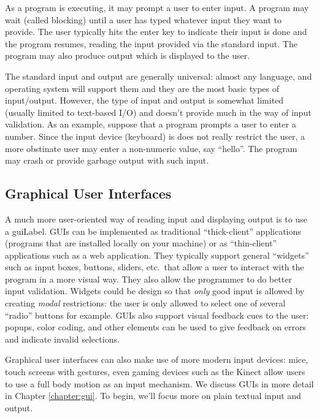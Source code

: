 As a program is executing, it may prompt a user to enter input.  A program
may wait (called blocking) until a user has typed whatever input they want to provide.
The user typically hits the enter key to indicate their input is done and the 
program resumes, reading the input provided via the standard input.  The
program may also produce output which is displayed to the user.

The standard input and output are generally universal: almost any language, 
and operating system will support them and they are the most basic types
of input/output.  However, the type of input and output is somewhat limited (usually limited
to text-based I/O) and doesn't provide much in the way of input \gls{validation}.
As an example, suppose that a program prompts a user to enter a number.  
Since the input device (keyboard) is does not really restrict the user, a more
obstinate user may enter a non-numeric value, say ``hello''.  The program
may crash or provide garbage output with such input.  

\subsection{Graphical User Interfaces}

A much more user-oriented way of reading input and displaying output is to use
a \gls{guiLabel}.  GUIs can be implemented as traditional ``thick-client'' applications
(programs that are installed locally on your machine) or as ``thin-client'' applications
such as a web application.  They typically support general ``widgets'' such as input
boxes, buttons, sliders, etc.\ that allow a user to interact with the program in a 
more visual way.  They also allow the programmer to do better input validation.  
Widgets could be design so that \emph{only} good input is allowed by creating
\emph{modal} restrictions: the user is only allowed to select one of several ``radio''
buttons for example.  GUIs also support visual feedback cues to the user: popups,
color coding, and other elements can be used to give feedback on errors and
indicate invalid selections.  

Graphical user interfaces can also make use of more modern input devices: mice, touch 
screens with gestures, even gaming devices such as the Kinect allow users to use
a full body motion as an input mechanism.  We discuss GUIs in more detail in 
Chapter \ref{chapter:gui}.  To begin, we'll focus more on plain textual input and output.


